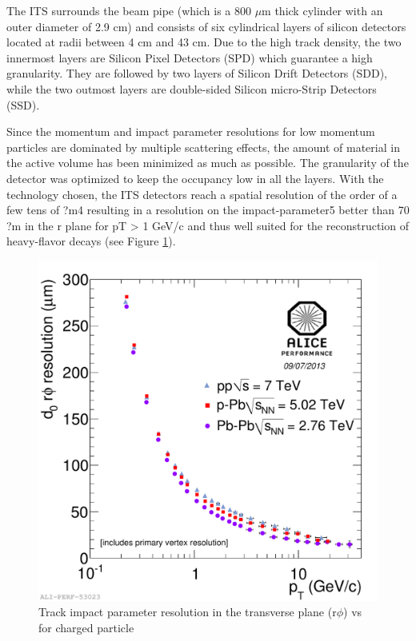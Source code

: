 The ITS surrounds the beam pipe (which is a 800 $\mu$m thick cylinder with an outer diameter of 2.9 cm) and consists of six cylindrical layers of silicon detectors located at radii between 4 cm and 43 cm. Due to the high track density, the two innermost layers are Silicon Pixel Detectors (SPD) which guarantee a high granularity. They are followed by two layers of Silicon Drift Detectors (SDD), while the two outmost layers are double-sided Silicon micro-Strip Detectors (SSD). 




Since the momentum and impact parameter resolutions for low momentum particles are dominated by multiple scattering effects, the amount of material in the active volume has been minimized as much as possible. The granularity of the detector was optimized to keep the occupancy low in all the layers. With the technology chosen, the ITS detectors reach a spatial resolution of the order of a few tens of ?m4 resulting in a resolution on the impact-parameter5 better than 70 ?m in the r  plane for pT > 1 GeV/c and thus well suited for the reconstruction of heavy-flavor decays (see Figure \ref{fig:itsperformance}).

\begin{figure}[htbp]
\begin{center}
\includegraphics[width=10.cm]{./Version1/FigChapter4/ITSPerformance}
\caption{Track impact parameter resolution in the transverse plane (r$\phi$) vs \pt for charged particle}
\label{fig:itsperformance}
\end{center}
\end{figure}


